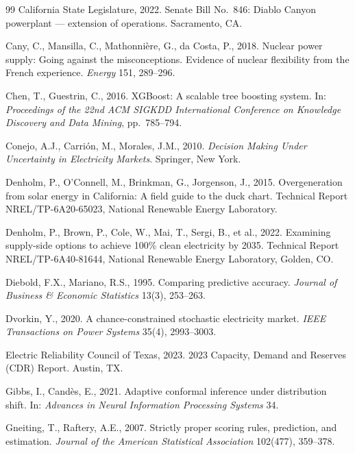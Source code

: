 \documentclass[preprint,12pt,authoryear]{elsarticle}
\begin{document}
\begin{thebibliography}{99}
California State Legislature, 2022. Senate Bill No.~846: Diablo Canyon powerplant --- extension of operations. Sacramento, CA.

Cany, C., Mansilla, C., Mathonni\`ere, G., da Costa, P., 2018. Nuclear power supply: Going against the misconceptions. Evidence of nuclear flexibility from the French experience. \textit{Energy} 151, 289--296.

Chen, T., Guestrin, C., 2016. XGBoost: A scalable tree boosting system. In: \textit{Proceedings of the 22nd ACM SIGKDD International Conference on Knowledge Discovery and Data Mining}, pp.~785--794.

Conejo, A.J., Carri\'on, M., Morales, J.M., 2010. \textit{Decision Making Under Uncertainty in Electricity Markets}. Springer, New York.

Denholm, P., O'Connell, M., Brinkman, G., Jorgenson, J., 2015. Overgeneration from solar energy in California: A field guide to the duck chart. Technical Report NREL/TP-6A20-65023, National Renewable Energy Laboratory.

Denholm, P., Brown, P., Cole, W., Mai, T., Sergi, B., et al., 2022. Examining supply-side options to achieve 100\% clean electricity by 2035. Technical Report NREL/TP-6A40-81644, National Renewable Energy Laboratory, Golden, CO.

Diebold, F.X., Mariano, R.S., 1995. Comparing predictive accuracy. \textit{Journal of Business \& Economic Statistics} 13(3), 253--263.

Dvorkin, Y., 2020. A chance-constrained stochastic electricity market. \textit{IEEE Transactions on Power Systems} 35(4), 2993--3003.

Electric Reliability Council of Texas, 2023. 2023 Capacity, Demand and Reserves (CDR) Report. Austin, TX.

Gibbs, I., Cand\`es, E., 2021. Adaptive conformal inference under distribution shift. In: \textit{Advances in Neural Information Processing Systems} 34.

Gneiting, T., Raftery, A.E., 2007. Strictly proper scoring rules, prediction, and estimation. \textit{Journal of the American Statistical Association} 102(477), 359--378.


\end{thebibliography}
\end{document}

